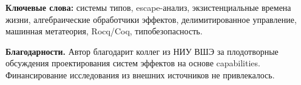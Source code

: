 \documentclass[12pt,a4paper]{article}
\begin{document}
    \vspace{0.4em}
    \noindent\textbf{Ключевые слова:}
    системы типов, escape-анализ, экзистенциальные времена жизни, алгебраические обработчики
    эффектов, делимитированное управление, машинная метатеория, Rocq/Coq, типобезопасность.

    \vspace{0.4em}
    \noindent\textbf{Благодарности.}
    Автор благодарит коллег из НИУ ВШЭ за плодотворные обсуждения проектирования систем
    эффектов на основе capabilities.
    Финансирование исследования из внешних источников не привлекалось.
\end{document}
